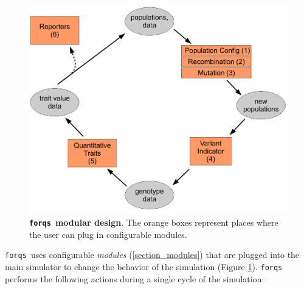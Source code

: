 \documentclass{article}
\newcommand{\forqs}[0]{\texttt{forqs }}
\begin{document}
\begin{figure}[th]
    \centerline{\includegraphics[width=.9\textwidth]{fig/forqs_design_2.pdf}}
    \caption{{\bf \forqs modular design}.  The orange boxes represent places
             where the user can plug in configurable modules.}
    \label{figure_design}
\end{figure}

\forqs uses configurable \emph{modules} (\autoref{section_modules}) that
are plugged into the main simulator to change the behavior of the simulation 
(Figure \ref{figure_design}).  
\forqs performs the following actions during a single
cycle of the simulation:
\end{document}
